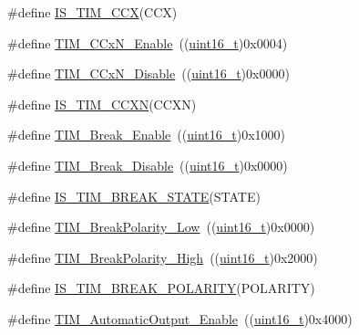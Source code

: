 \begin{DoxyCompactItemize}
\item 
\#define \hyperlink{group___t_i_m___capture___compare__state_ga5b7461e8c9c25f6fa082118c95b02ba1}{I\+S\+\_\+\+T\+I\+M\+\_\+\+C\+CX}(C\+CX)
\item 
\#define \hyperlink{group___t_i_m___capture___compare___n__state_gab534ddf23d317eb912564292c1cede2d}{T\+I\+M\+\_\+\+C\+Cx\+N\+\_\+\+Enable}~((\hyperlink{_p_e___types_8h_a1f1825b69244eb3ad2c7165ddc99c956}{uint16\+\_\+t})0x0004)
\item 
\#define \hyperlink{group___t_i_m___capture___compare___n__state_ga0d7d46aeba33ed197aa39775bc527d7d}{T\+I\+M\+\_\+\+C\+Cx\+N\+\_\+\+Disable}~((\hyperlink{_p_e___types_8h_a1f1825b69244eb3ad2c7165ddc99c956}{uint16\+\_\+t})0x0000)
\item 
\#define \hyperlink{group___t_i_m___capture___compare___n__state_gad5a9f961e44c8d7c24066ac37ec79cbc}{I\+S\+\_\+\+T\+I\+M\+\_\+\+C\+C\+XN}(C\+C\+XN)
\item 
\#define \hyperlink{group___break___input__enable__disable_gae7fbc11ac043454b2a880bffe98fdb8c}{T\+I\+M\+\_\+\+Break\+\_\+\+Enable}~((\hyperlink{_p_e___types_8h_a1f1825b69244eb3ad2c7165ddc99c956}{uint16\+\_\+t})0x1000)
\item 
\#define \hyperlink{group___break___input__enable__disable_ga31ba16dd70ad4d99adc911f7bf6662e5}{T\+I\+M\+\_\+\+Break\+\_\+\+Disable}~((\hyperlink{_p_e___types_8h_a1f1825b69244eb3ad2c7165ddc99c956}{uint16\+\_\+t})0x0000)
\item 
\#define \hyperlink{group___break___input__enable__disable_ga29dd5484bdc69a467387bd8059b69f0e}{I\+S\+\_\+\+T\+I\+M\+\_\+\+B\+R\+E\+A\+K\+\_\+\+S\+T\+A\+TE}(S\+T\+A\+TE)
\item 
\#define \hyperlink{group___break___polarity_ga565656ca81d17f9a1807afe3971dff6e}{T\+I\+M\+\_\+\+Break\+Polarity\+\_\+\+Low}~((\hyperlink{_p_e___types_8h_a1f1825b69244eb3ad2c7165ddc99c956}{uint16\+\_\+t})0x0000)
\item 
\#define \hyperlink{group___break___polarity_gabd4b72079548fd8903413a348539542b}{T\+I\+M\+\_\+\+Break\+Polarity\+\_\+\+High}~((\hyperlink{_p_e___types_8h_a1f1825b69244eb3ad2c7165ddc99c956}{uint16\+\_\+t})0x2000)
\item 
\#define \hyperlink{group___break___polarity_gaa29e33e74c5ff10972357ddd3f47f078}{I\+S\+\_\+\+T\+I\+M\+\_\+\+B\+R\+E\+A\+K\+\_\+\+P\+O\+L\+A\+R\+I\+TY}(P\+O\+L\+A\+R\+I\+TY)
\item 
\#define \hyperlink{group___t_i_m___a_o_e___bit___set___reset_gaa416873d01fe62fe8d3f9c8bb7853fa1}{T\+I\+M\+\_\+\+Automatic\+Output\+\_\+\+Enable}~((\hyperlink{_p_e___types_8h_a1f1825b69244eb3ad2c7165ddc99c956}{uint16\+\_\+t})0x4000)

\end{DoxyCompactItemize}
